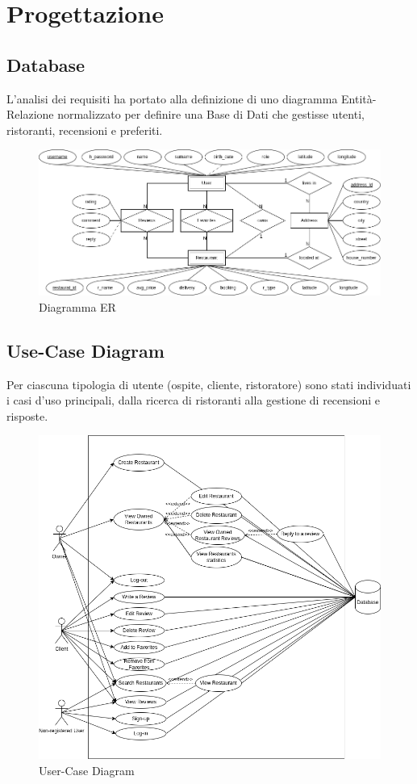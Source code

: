\section{Progettazione}

\subsection{Database}
L'analisi dei requisiti ha portato alla definizione di uno diagramma Entità-Relazione normalizzato per definire una Base di Dati
che gestisse utenti, ristoranti, recensioni e preferiti.
\begin{figure}[H]
  \centering
  \includegraphics[width=\textwidth]{images/ER-refactored.png}
  \caption{Diagramma ER}
  \label{fig:er-diagram}
\end{figure}

\subsection{Use-Case Diagram}
Per ciascuna tipologia di utente (ospite, cliente, ristoratore) sono stati individuati 
i casi d'uso principali, dalla ricerca di ristoranti alla gestione 
di recensioni e risposte.

\begin{figure}[H]
  \centering
  \includegraphics[width=\textwidth]{images/UML-Use-Case.png}
  \caption{User-Case Diagram}
  \label{fig:usecase-diagram}
\end{figure}
